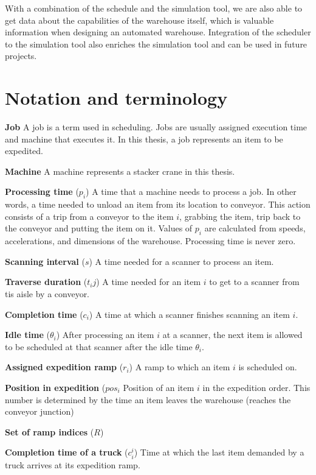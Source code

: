 \documentclass{ctuthesis}
\begin{document}
With a combination of the schedule and the simulation tool, we are also able to get data about the capabilities of the warehouse itself, which is valuable information when designing an automated warehouse. Integration of the scheduler to the simulation tool also enriches the simulation tool and can be used in future projects.


\section{Notation and terminology}

\noindent \textbf{Job} A job is a term used in scheduling. Jobs are usually assigned execution time and machine that executes it. In this thesis, a job represents an item to be expedited. 

\noindent \textbf{Machine} A machine represents a stacker crane in this thesis.

\noindent \textbf{Processing time} ($p_i$) A time that a machine needs to process a job. In other words, a time needed to unload an item from its location to conveyor. This action consists of a trip from a conveyor to the item $i$, grabbing the item, trip back to the conveyor and putting the item on it. Values of $p_i$ are calculated from speeds, accelerations, and dimensions of the warehouse. Processing time is never zero.

\noindent \textbf{Scanning interval} ($s$) A time needed for a scanner to process an item.

\noindent \textbf{Traverse duration} ($t_ij$) A time needed for an item $i$ to get to a scanner from tis aisle by a conveyor.

\noindent \textbf{Completion time} ($c_i$) A time at which a scanner finishes scanning an item $i$.

\noindent \textbf{Idle time} ($\theta_i$) After processing an item $i$ at a scanner, the next item is allowed to be scheduled at that scanner after the idle time $\theta_i$.

\noindent \textbf{Assigned expedition ramp} ($r_i$) A ramp to which an item $i$ is scheduled on.

\noindent \textbf{Position in expedition} ($pos_i$ Position of an item $i$ in the expedition order. This number is determined by the time an item leaves the warehouse (reaches the conveyor junction)

\noindent \textbf{Set of ramp indices} ($R$) 

\noindent \textbf{Completion time of a truck} ($c_i^i$) Time at which the last item demanded by a truck arrives at its expedition ramp.
\end{document}
